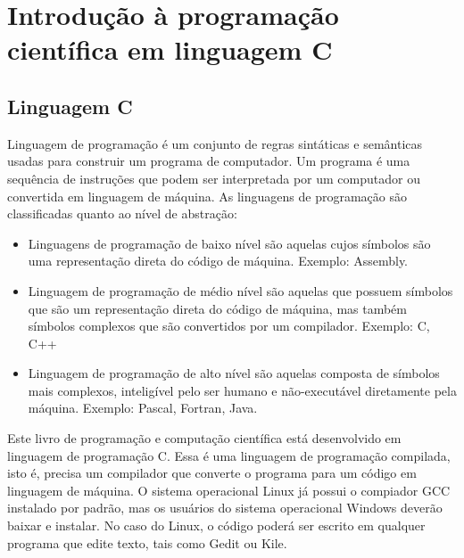 

\chapter{Introdução à programação científica em linguagem C}
\section{Linguagem C}
Linguagem de programação é um conjunto de regras sintáticas e semânticas usadas para construir um programa de computador. Um programa é uma sequência de instruções que podem ser interpretada por um computador ou convertida em linguagem de máquina.
As linguagens de programação são classificadas quanto ao nível de abstração:
\begin{itemize}
\item Linguagens de programação de baixo nível são aquelas cujos símbolos são uma representação direta do código de máquina. Exemplo: Assembly.

\item Linguagem de programação de médio nível são aquelas que possuem símbolos que são um representação direta do código de máquina, mas também símbolos complexos que são convertidos por um compilador. Exemplo: C, C++

\item Linguagem de programação de alto nível são aquelas composta de símbolos mais complexos, inteligível pelo ser humano e não-executável diretamente pela máquina. Exemplo: Pascal, Fortran, Java.
\end{itemize}

Este livro de programação e computação científica está desenvolvido em linguagem de programação C. Essa é uma linguagem de programação compilada, isto é, precisa um compilador que converte o programa para um código em linguagem de máquina. O sistema operacional Linux já possui o compiador GCC instalado por padrão, mas os usuários do sistema operacional Windows deverão baixar e instalar. No caso do Linux, o código poderá ser escrito em qualquer programa que edite texto, tais como Gedit ou Kile.

